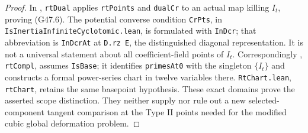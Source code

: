 \begin{proof}
In ,
\texttt{rtDual} applies \texttt{rtPoints} and \texttt{dualCr}
to an actual map killing $I_t$, proving (G47.6).
The potential converse condition \texttt{CrPts}, in
\texttt{IsInertiaInfiniteCyclotomic.lean}, is formulated with
\texttt{InDcr}; that abbreviation is
\texttt{InDcrAt} at \texttt{D.rz E}, the distinguished
diagonal representation.  It is not a universal statement
about all coefficient-field points of $I_t$.
Correspondingly ,
\texttt{rtCompl}, assumes \texttt{IsBase}; it identifies
\texttt{primesAt0} with the singleton $\{I_t\}$ and constructs
a formal power-series chart in twelve variables there.
\texttt{RtChart.lean}, \texttt{rtChart}, retains the same
basepoint hypothesis.
These exact domains prove the asserted scope distinction.
They neither supply nor rule out a new selected-component
tangent comparison at the Type II points needed for the
modified cubic global deformation problem.
\end{proof}
